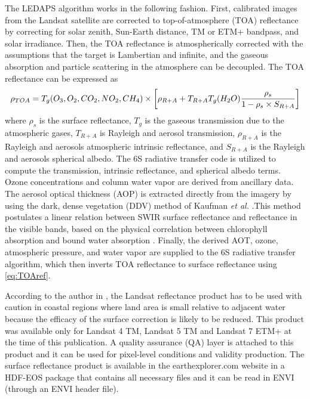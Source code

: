 The LEDAPS algorithm works in the following fashion. First, calibrated images from the Landsat satellite are corrected to { top-of-atmosphere (TOA) reflectance} by correcting for solar zenith, Sun-Earth distance, TM or ETM+ bandpass, and solar irradiance. Then, the TOA reflectance is atmospherically corrected with the assumptions that the target is Lambertian and infinite, and the gaseous absorption and particle scattering in the atmosphere can be decoupled. The TOA reflectance can be expressed as \cite{Masek:2006}
\begin{equation}
	\rho_{TOA}=T_g(O_3,O_2,CO_2,NO_2,CH_4)\\	
		\times \left[\rho_{R+A}+T_{R+A}T_g(H_2O)\frac{\rho_s}{1-\rho_s\times S_{R+A}}\right]
		\label{eq:TOAref} 
\end{equation}
where $\rho_s$ is the surface reflectance, $T_g$ is the gaseous transmission due to the atmospheric gases, $T_{R+A}$ is Rayleigh and aerosol transmission, $\rho_{R+A}$ is the Rayleigh and aerosols atmospheric intrinsic reflectance, and $S_{R+A}$ is the Rayleigh and aerosols spherical albedo. The 6S radiative transfer code is utilized to compute the transmission, intrinsic reflectance, and spherical albedo terms. Ozone concentrations and column water vapor are derived from ancillary data. The aerosol optical thickness (AOP) is extracted directly from the imagery by using the dark, dense vegetation (DDV) method of Kaufman {\it et al.} .This method postulates a linear relation between SWIR surface reflectance and reflectance in the visible bands, based on the physical correlation between chlorophyll absorption and bound water absorption . Finally, the derived AOT, ozone, atmospheric pressure, and water vapor are supplied to the 6S radiative transfer algorithm, which then inverts TOA reflectance to surface reflectance using \autoref{eq:TOAref}. 

According to the author in \cite{LandsatCDR}, the Landsat reflectance product has to be used with caution in coastal regions where land area is small relative to adjacent water because the efficacy of the surface correction is likely to be reduced. This product was available only for Landsat 4 TM, Landsat 5 TM and Landsat 7 ETM+ at the time of this publication. A quality assurance (QA) layer is attached to this product and it can be used for pixel-level conditions and validity production. The surface reflectance product is available in the earthexplorer.com website in a HDF-EOS package that contains all necessary files and it can be read in ENVI (through an ENVI header file).
